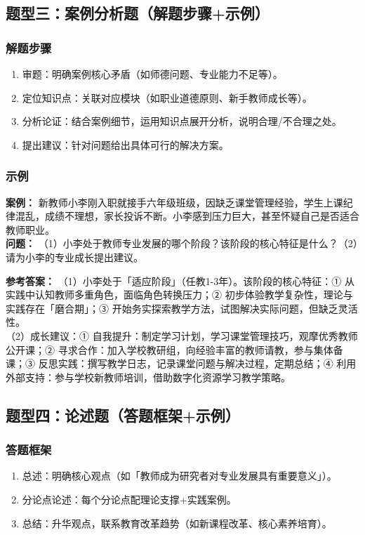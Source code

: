 \documentclass[12pt,a4paper]{article}
\begin{document}
\subsection{题型三：案例分析题（解题步骤+示例）}
\subsubsection{解题步骤}
\begin{enumerate}[label=1.,itemsep=0.3ex]
\item 审题：明确案例核心矛盾（如师德问题、专业能力不足等）。
\item 定位知识点：关联对应模块（如职业道德原则、新手教师成长等）。
\item 分析论证：结合案例细节，运用知识点展开分析，说明合理/不合理之处。
\item 提出建议：针对问题给出具体可行的解决方案。
\end{enumerate}

\subsubsection{示例}
\textbf{案例：} 新教师小李刚入职就接手六年级班级，因缺乏课堂管理经验，学生上课纪律混乱，成绩不理想，家长投诉不断。小李感到压力巨大，甚至怀疑自己是否适合教师职业。\\
\textbf{问题：} （1）小李处于教师专业发展的哪个阶段？该阶段的核心特征是什么？（2）请为小李的专业成长提出建议。

\textbf{参考答案：}
（1）小李处于「适应阶段」（任教1-3年）。该阶段的核心特征：① 从实践中认知教师多重角色，面临角色转换压力；② 初步体验教学复杂性，理论与实践存在「磨合期」；③ 开始务实探索教学方法，试图解决实际问题，但缺乏灵活性。\\
（2）成长建议：① 自我提升：制定学习计划，学习课堂管理技巧，观摩优秀教师公开课；② 寻求合作：加入学校教研组，向经验丰富的教师请教，参与集体备课；③ 反思实践：撰写教学日志，记录课堂问题与解决过程，定期总结；④ 利用外部支持：参与学校新教师培训，借助数字化资源学习教学策略。

\subsection{题型四：论述题（答题框架+示例）}
\subsubsection{答题框架}
\begin{enumerate}[label=•,itemsep=0.3ex]
\item 总述：明确核心观点（如「教师成为研究者对专业发展具有重要意义」）。
\item 分论点论述：每个分论点配理论支撑+实践案例。
\item 总结：升华观点，联系教育改革趋势（如新课程改革、核心素养培育）。
\end{enumerate}
\end{document}
